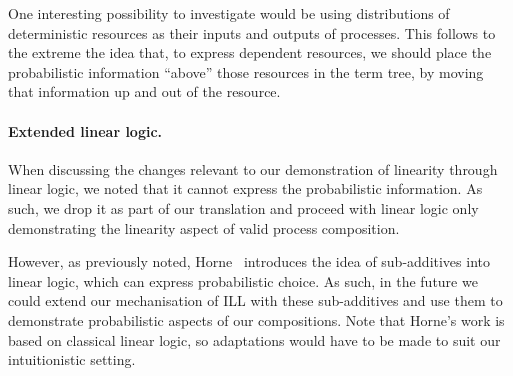 \documentclass[class=smolathesis,crop=false]{standalone}
\begin{document}
One interesting possibility to investigate would be using distributions of deterministic resources as their inputs and outputs of processes.
This follows to the extreme the idea that, to express dependent resources, we should place the probabilistic information ``above'' those resources in the term tree, by moving that information up and out of the resource.

\paragraph*{Extended linear logic.}
When discussing the changes relevant to our demonstration of linearity through linear logic, we noted that it cannot express the probabilistic information.
As such, we drop it as part of our translation and proceed with linear logic only demonstrating the linearity aspect of valid process composition.

However, as previously noted, Horne~\cite{horne-2019} introduces the idea of sub-additives into linear logic, which can express probabilistic choice.
As such, in the future we could extend our mechanisation of ILL with these sub-additives and use them to demonstrate probabilistic aspects of our compositions.
Note that Horne's work is based on classical linear logic, so adaptations would have to be made to suit our intuitionistic setting.

\ifstandalone


\fi
\end{document}
